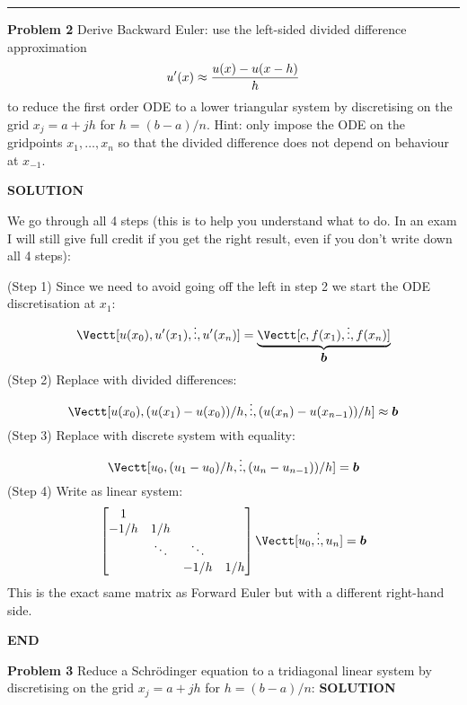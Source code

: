 \documentclass[12pt,a4paper]{article}
\def\b{ {\vc b} }
\begin{document}
\rule{\textwidth}{1pt}
\textbf{Problem 2} Derive  Backward Euler: use the left-sided divided difference approximation
\[
u'(x) \ensuremath{\approx} {u(x) - u(x-h)  \over h}
\]
to reduce the first order ODE
to a lower triangular system by discretising on the grid $x_j = a + j h$ for $h = (b-a)/n$. Hint: only impose the ODE on the gridpoints $x_1,\ensuremath{\ldots},x_n$ so that the divided difference does not depend on behaviour at $x_{-1}$.

\textbf{SOLUTION}

We go through all 4 steps (this is to help you understand what to do. In an exam I will still give full credit if you get the right result, even if you don't write down all 4 steps):

(Step 1) Since we need to avoid going off the left in step 2 we start the ODE discretisation at $x_1$:
\[
\Vectt[u(x_0), u'(x_1), \ensuremath{\vdots}, u'(x_n)] = \underbrace{\Vectt[c, f(x_1),\ensuremath{\vdots},f(x_n)]}_{\ensuremath{\bm{\b}}}
\]
(Step 2) Replace with divided differences:
\[
\Vectt[u(x_0), (u(x_1)-u(x_0))/h, \ensuremath{\vdots}, (u(x_n)-u(x_{n-1}))/h] \ensuremath{\approx} \ensuremath{\bm{\b}}
\]
(Step 3) Replace with discrete system with equality:
\[
\Vectt[u_0, (u_1-u_0)/h, \ensuremath{\vdots}, (u_n-u_{n-1}))/h] = \ensuremath{\bm{\b}}
\]
(Step 4) Write as linear system:
\[
\begin{bmatrix}
1 \\
-1/h & 1/h \\
& \ensuremath{\ddots} & \ensuremath{\ddots} \\
&& -1/h & 1/h 
\end{bmatrix} \Vectt[u_0,\ensuremath{\vdots},u_n] = \ensuremath{\bm{\b}}
\]
This is the exact same matrix as Forward Euler but with a different right-hand side.

\textbf{END}

\textbf{Problem 3} Reduce a Schrödinger equation to a tridiagonal linear system by discretising on the grid $x_j = a + j h$ for $h = (b-a)/n$:
\textbf{SOLUTION}
\end{document}
